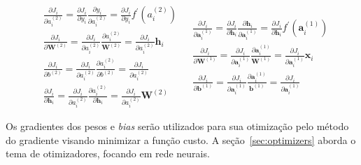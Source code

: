 \begin{subequations} \label{eq:nn-backprop}
\begin{align}
    &\frac{\partial{J_i}}{\partial{a_i^{(2)}}}
        = \frac{\partial{J_i}}{\partial{y_i}} \frac{\partial{y_i}}{\partial{a_i^{(2)}}}
        = \frac{\partial{J_i}}{\partial{y_i}} f^{\prime}(a_i^{(2)}) \label{eq:nn-backprop-a2}\\
    &\frac{\partial{J_i}}{\partial{\mathbf{W}^{(2)}}}
        = \frac{\partial{J_i}}{\partial{a_i^{(2)}}} \frac{\partial{a_i^{(2)}}}{\mathbf{W}^{(2)}}
        = \frac{\partial{J_i}}{\partial{a_i^{(2)}}} \mathbf{h}_i \label{eq:nn-backprop-w2}\\
    &\frac{\partial{J_i}}{\partial{b^{(2)}}}
        = \frac{\partial{J_i}}{\partial{a_i^{(2)}}} \frac{\partial{a_i^{(2)}}}{\partial{b^{(2)}}}
        = \frac{\partial{J_i}}{\partial{a_i^{(2)}}} \label{eq:nn-backprop-b2}\\
    &\frac{\partial{J_i}}{\partial{\mathbf{h}_i}}
        = \frac{\partial{J_i}}{\partial{a_i^{(2)}}} \frac{\partial{a_i^{(2)}}}{\partial{\mathbf{h}_i}}
        = \frac{\partial{J_i}}{\partial{a_i^{(2)}}} \mathbf{W}^{(2)} \label{eq:nn-backprop-h}
\end{align}

\begin{align}
    &\frac{\partial{J_i}}{\partial{\mathbf{a}_i^{(1)}}}
        = \frac{\partial{J_i}}{\partial{\mathbf{h}_i}} \frac{\partial{\mathbf{h}_i}}{\partial{\mathbf{a}_i^{(1)}}}
        = \frac{\partial{J_i}}{\partial{\mathbf{h}_i}} f^{\prime}(\mathbf{a}_i^{(1)})\\
    &\frac{\partial{J_i}}{\partial{\mathbf{W}^{(1)}}}
        = \frac{\partial{J_i}}{\partial{\mathbf{a}_i^{(1)}}} \frac{\partial{\mathbf{a}_i^{(1)}}}{\mathbf{W}^{(1)}}
        = \frac{\partial{J_i}}{\partial{\mathbf{a}_i^{(1)}}} \mathbf{x}_i \label{eq:nn-backprop-w1}\\
    &\frac{\partial{J_i}}{\partial{\mathbf{b}^{(1)}}}
        = \frac{\partial{J_i}}{\partial{\mathbf{a}_i^{(1)}}} \frac{\partial{\mathbf{a}_i^{(1)}}}{\mathbf{b}^{(1)}}
        = \frac{\partial{J_i}}{\partial{\mathbf{a}_i^{(1)}}} \label{eq:nn-backprop-b1}
\end{align}
\end{subequations}

Os gradientes dos pesos e \textit{bias} serão utilizados para sua otimização pelo método do gradiente visando minimizar
a função custo.
A seção~\ref{sec:optimizers} aborda o tema de otimizadores, focando em rede neurais.

